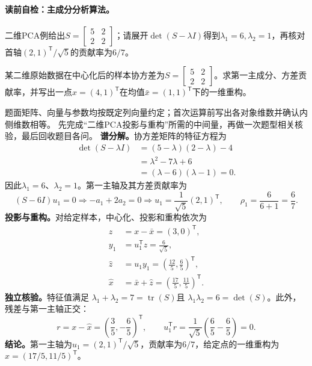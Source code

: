\paragraph{读前自检：主成分分析算法。}二维PCA例给出$S=\begin{bmatrix}5&2\\2&2\end{bmatrix}$；请展开$\det(S-\lambda I)$得到$\lambda_1=6,\lambda_2=1$，再核对首轴$(2,1)^{\mathsf T}/\sqrt5$的贡献率为$6/7$。\par

\label{struct:V4-C04-CH32}
\begin{example}[二维PCA投影与重构]\label{exm:V4-C04-pca-projection}
某二维原始数据在中心化后的样本协方差为$S=\begin{bmatrix}5&2\\2&2\end{bmatrix}$。求第一主成分、方差贡献率，并写出一点$x=(4,1)^{\mathsf T}$在均值$\bar x=(1,1)^{\mathsf T}$下的一维重构。

\label{struct:V4-C04-CH33}
\end{example}
\begin{solution}
\SolGiven 题面矩阵、向量与参数均按既定列向量约定；首次运算前写出各对象维数并确认内侧维数相等。
\SolPlan 先完成“二维PCA投影与重构”所需的中间量，再做一次题型相关核验，最后回收题目各问。
\SolDerive
\textbf{谱分解。}协方差矩阵的特征方程为
\[
\begin{aligned}
\det(S-\lambda I)
&=(5-\lambda)(2-\lambda)-4\\
&=\lambda^2-7\lambda+6\\
&=(\lambda-6)(\lambda-1)=0.
\end{aligned}
\]
因此$\lambda_1=6$、$\lambda_2=1$。第一主轴及其方差贡献率为
\[
(S-6I)u_1=0
\Longrightarrow -a_1+2a_2=0
\Longrightarrow u_1=\frac{1}{\sqrt5}(2,1)^{\mathsf T},
\qquad
\rho_1=\frac{6}{6+1}=\frac67.
\]
\textbf{投影与重构。}对给定样本，中心化、投影和重构依次为
\[
\begin{aligned}
z&=x-\bar x=(3,0)^{\mathsf T},\\
y_1&=u_1^{\mathsf T}z=\frac6{\sqrt5},\\
\widehat z&=u_1y_1=\left(\frac{12}{5},\frac65\right)^{\mathsf T},\\
\widehat x&=\bar x+\widehat z
=\left(\frac{17}{5},\frac{11}{5}\right)^{\mathsf T}.
\end{aligned}
\]
\textbf{独立核验。}特征值满足
$\lambda_1+\lambda_2=7=\operatorname{tr}(S)$且
$\lambda_1\lambda_2=6=\det(S)$。此外，残差与第一主轴正交：
\[
r=x-\widehat x=\left(\frac35,-\frac65\right)^{\mathsf T},
\qquad
u_1^{\mathsf T}r
=\frac1{\sqrt5}\left(\frac65-\frac65\right)=0.
\]
\textbf{结论。}第一主轴为$u_1=(2,1)^{\mathsf T}/\sqrt5$，贡献率为$6/7$，给定点的一维重构为
$\widehat x=(17/5,11/5)^{\mathsf T}$。
\end{solution}

